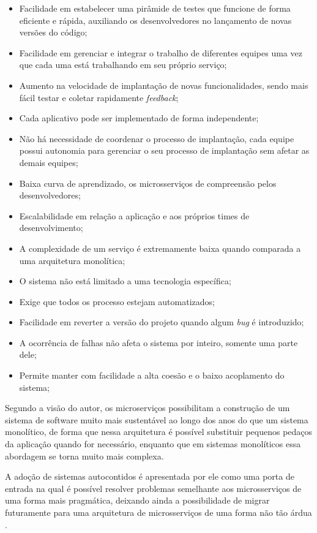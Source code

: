 \begin{itemize}
    \item Facilidade em estabelecer uma pirâmide de testes que funcione de forma eficiente e rápida,
        auxiliando os desenvolvedores no lançamento de novas versões do código;
    \item Facilidade em gerenciar e integrar o trabalho de diferentes equipes uma vez que cada uma
        está trabalhando em seu próprio serviço;
    \item Aumento na velocidade de implantação de novas funcionalidades, sendo mais fácil testar e
        coletar rapidamente \textit{feedback};
    \item Cada aplicativo pode ser implementado de forma independente;
    \item Não há necessidade de coordenar o processo de implantação, cada equipe possui autonomia
        para gerenciar o seu processo de implantação sem afetar as demais equipes;
    \item Baixa curva de aprendizado, os microsserviços de compreensão pelos desenvolvedores;
    \item Escalabilidade em relação a aplicação e aos próprios times de desenvolvimento;
    \item A complexidade de um serviço é extremamente baixa quando comparada a uma arquitetura
        monolítica;
    \item O sistema não está limitado a uma tecnologia específica;
    \item Exige que todos os processo estejam automatizados;
    \item Facilidade em reverter a versão do projeto quando algum \textit{bug} é introduzido;
    \item A ocorrência de falhas não afeta o sistema por inteiro, somente uma parte dele;
    \item Permite manter com facilidade a alta coesão e o baixo acoplamento do sistema;
\end{itemize}

Segundo a visão do autor, os microserviços possibilitam a construção de um sistema de software muito
mais sustentável ao longo dos anos do que um sistema monolítico, de forma que nessa arquitetura é
possível substituir pequenos pedaços da aplicação quando for necessário, enquanto que em sistemas
monolíticos essa abordagem se torna muito mais complexa.

A adoção de sistemas autocontidos é apresentada por ele como uma porta de entrada na qual é possível
resolver problemas semelhante aos microsserviços de uma forma mais pragmática, deixando ainda a
possibilidade de migrar futuramente para uma arquitetura de microsserviços de uma forma não tão
árdua \cite{Guido2016:WhyMicroservices}.

